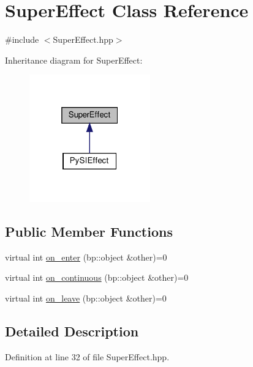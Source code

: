 \hypertarget{class_super_effect}{}\section{Super\+Effect Class Reference}
\label{class_super_effect}


{\ttfamily \#include $<$Super\+Effect.\+hpp$>$}



Inheritance diagram for Super\+Effect\+:\nopagebreak
\begin{figure}[H]
\begin{center}
\leavevmode
\includegraphics[width=148pt]{class_super_effect__inherit__graph}
\end{center}
\end{figure}
\subsection*{Public Member Functions}
\begin{DoxyCompactItemize}
\item 
virtual int \mbox{\hyperlink{class_super_effect_ad742a44d394bcfde1cf8899a33713184}{on\+\_\+enter}} (bp\+::object \&other)=0
\item 
virtual int \mbox{\hyperlink{class_super_effect_aa94d8221f92a6b045589dc9df4c4d049}{on\+\_\+continuous}} (bp\+::object \&other)=0
\item 
virtual int \mbox{\hyperlink{class_super_effect_a5f8e89f4930f8f47da22994d0a1b1a61}{on\+\_\+leave}} (bp\+::object \&other)=0
\end{DoxyCompactItemize}


\subsection{Detailed Description}


Definition at line 32 of file Super\+Effect.\+hpp.



